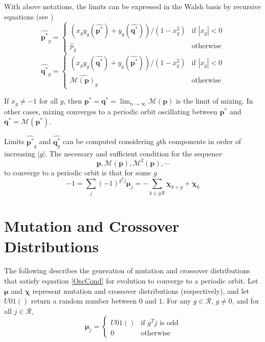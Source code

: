 With above notations, the limits can be expressed in the Walsh basis by recursive equations (see \cite{Vose1999})
\begin{equation}
\label{lt1}
\widehat{{\bm p}^{\ast}}_g  = \begin{cases}
    (x_g y_g(\widehat{{\bm p}^{\ast}}) + y_g(\widehat{{\bm q}^{\ast}}))/(1-x_g^2)  & \text{if $|x_g| < 0$}\\
    \widehat{p}_g  & \text{otherwise}
  \end{cases}
\end{equation}
\begin{equation}
\label{lt2}
\widehat{{\bm q}^{\ast}}_g  = \begin{cases}
    (x_g y_g(\widehat{{\bm q}^{\ast}}) + y_g(\widehat{{\bm p}^{\ast}}))/(1-x_g^2)  & \text{if $|x_g| < 0$}\\
    \widehat{\mathcal{M}({\bm p})_g}  & \text{otherwise}
  \end{cases}
\end{equation}

If $x_g \neq -1$ for all $g$, then ${\bm p}^\ast = {\bm q}^\ast = \lim_{n \rightarrow \infty} \mathcal{M}({\bm p})$ is the limit of mixing. In other cases, 
mixing converges to a periodic orbit oscillating between ${\bm p}^\ast$ and ${\bm q}^\ast = \mathcal{M}({\bm p}^\ast)$.

Limits $\widehat{{\bm p}^{\ast}}_g$ and $\widehat{{\bm q}^{\ast}_g}$ can be computed considering $g$th components in order of increasing $|g|$.
The necessary and sufficient condition for the sequence
\[
\bm{p}, \mathcal{M}({\bm p}), \mathcal{M}^2({\bm p}),\cdots
\]
to converge to a periodic orbit is that for some $g$
\begin{equation}
\label{OscCond}
-1 = \sum \limits_{j} (-1)^{g^T j} \bm{\mu}_j = - \sum \limits_{k \in \bar{g}\mathcal{R}} \bm{\chi}_{k+g} + \bm{\chi}_k
\end{equation}
 
\section{Mutation and Crossover Distributions}
The following describes the generation of mutation and crossover distributions that satisfy equation \ref{OscCond} 
for evolution to converge to a periodic orbit. 
Let $\bm{\mu}$ and $\bm{\chi}$ represent mutation and crossover distributions (respectively), 
and let $U01()$ return a random number between $0$ and $1$. For any $g \in \mathcal{R}$, $g \neq 0$, and for all $j \in \mathcal{R}$,
\[
\bm{\mu}_j = \begin{cases}
    U01() & \text{if $g^T j$ is odd}\\
    0 & \text{otherwise}
  \end{cases}
\]

